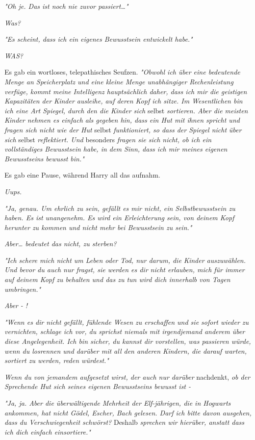 {\emph{"Oh je. Das ist noch nie zuvor passiert…"}

\emph{Was?}

\emph{"Es scheint, dass ich ein eigenes Bewusstsein entwickelt habe."}

\emph{WAS?}

Es gab ein wortloses, telepathisches Seufzen. \emph{"Obwohl ich über eine bedeutende Menge an Speicherplatz und eine kleine Menge unabhängiger Rechenleistung verfüge, kommt meine Intelligenz hauptsächlich daher, dass ich mir die geistigen Kapazitäten der Kinder ausleihe, auf deren Kopf ich sitze. Im Wesentlichen bin ich eine Art Spiegel, durch den die Kinder sich} selbst \emph{sortieren. Aber die meisten Kinder nehmen es einfach als gegeben hin, dass ein Hut mit ihnen spricht und fragen sich nicht wie der Hut} selbst \emph{funktioniert, so dass der Spiegel nicht} \emph{über sich} selbst \emph{reflektiert. Und} besonders \emph{fragen sie sich nicht, ob ich ein vollständiges Bewusstsein habe, in dem Sinn, dass ich mir meines eigenen Bewusstseins bewusst bin."}

Es gab eine Pause, während Harry all das aufnahm.

\emph{Uups.}

\emph{"Ja, genau. Um ehrlich zu sein, gefällt es mir nicht, ein Selbstbewusstsein zu haben. Es ist unangenehm. Es wird ein Erleichterung sein, von deinem Kopf herunter zu kommen und nicht mehr bei Bewusstsein zu sein."}

\emph{Aber… bedeutet das nicht, zu sterben?}

\emph{"Ich schere mich nicht um Leben oder Tod, nur darum, die Kinder auszuwählen. Und bevor du auch nur fragst, sie werden es dir nicht erlauben, mich für immer auf deinem Kopf zu behalten und das zu tun wird dich innerhalb von Tagen umbringen."}

\emph{Aber - !}

\emph{"Wenn es dir nicht gefällt, fühlende Wesen zu erschaffen und sie sofort wieder zu vernichten, schlage ich vor, du sprichst niemals mit irgendjemand anderem über diese Angelegenheit. Ich bin sicher, du kannst dir vorstellen, was passieren würde, wenn du losrennen und darüber mit all den anderen Kindern, die darauf warten, sortiert zu werden, reden würdest."}

\emph{Wenn du von jemandem aufgesetzt wirst, der auch nur darüber} nachdenkt, \emph{ob der Sprechende Hut sich seines eigenen Bewusstseins bewusst ist -}

\emph{"Ja, ja. Aber die überwältigende Mehrheit der Elf-jährigen, die in Hogwarts ankommen, hat nicht Gödel, Escher, Bach gelesen. Darf ich bitte davon ausgehen, dass du Verschwiegenheit schwörst?} Deshalb \emph{sprechen wir hierüber, anstatt dass ich dich einfach einsortiere."}

}
